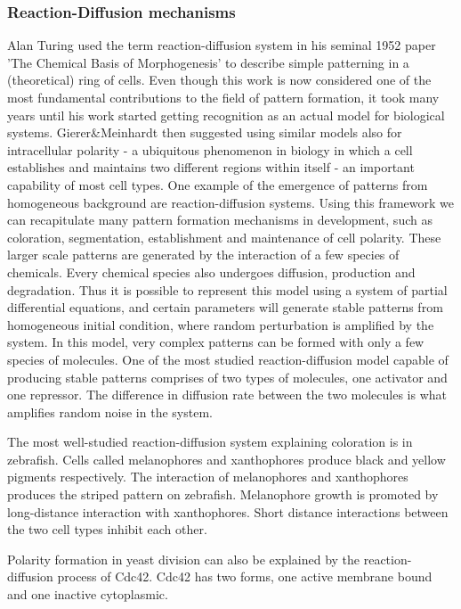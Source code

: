 \documentclass[fleqn,10pt]{wlscirep}
\begin{document}
\subsubsection*{Reaction-Diffusion mechanisms}
Alan Turing used the term reaction-diffusion system in his seminal 1952 paper 'The Chemical Basis of Morphogenesis' to describe simple patterning in a (theoretical) ring of cells. Even though this work is now considered one of the most fundamental contributions to the field of pattern formation, it took many years until his work started getting recognition as an actual model for biological systems. Gierer\&Meinhardt \cite{gierer1972theory} then suggested using similar models also for intracellular polarity - a ubiquitous phenomenon in biology in which a cell establishes and maintains two different regions within itself - an important capability of most cell types. 
One example of the emergence of patterns from homogeneous background are reaction-diffusion systems. Using this framework we can recapitulate many pattern formation mechanisms in development, such as coloration, segmentation, establishment and maintenance of cell polarity. These larger scale patterns are generated by the interaction of a few species of chemicals. Every chemical species also undergoes diffusion, production and degradation. Thus it is possible to represent this model using a system of partial differential equations, and certain parameters will generate stable patterns from homogeneous initial condition, where random perturbation is amplified by the system. In this model, very complex patterns can be formed with only a few species of molecules\cite{kondo2010reaction}. One of the most studied reaction-diffusion model capable of producing stable patterns comprises of two types of molecules, one activator and one repressor. The difference in diffusion rate between the two molecules is what amplifies random noise in the system.\cite{gierer1972theory}

The most well-studied reaction-diffusion system explaining coloration is in zebrafish. Cells called melanophores and xanthophores produce black and yellow pigments respectively.\cite{nakamasu2009interactions} The interaction of melanophores and xanthophores produces the striped pattern on zebrafish. Melanophore growth is promoted by long-distance interaction with xanthophores. Short distance interactions between the two cell types inhibit each other.

Polarity formation in yeast division can also be explained by the reaction-diffusion process of Cdc42. Cdc42 has two forms, one active membrane bound and one inactive cytoplasmic.  \cite{goryachev2008dynamics}
\end{document}
